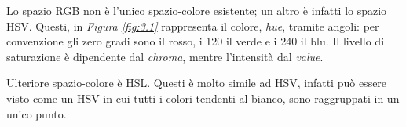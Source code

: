 \documentclass{subfiles}
\begin{document}
Lo spazio RGB non è l'unico spazio-colore esistente; un altro è infatti lo spazio HSV.
Questi, in \emph{Figura \ref{fig:3.1}} rappresenta il colore, \emph{hue}, tramite angoli: per convenzione gli zero gradi sono il rosso, i 120 il verde e i 240 il blu.
Il livello di saturazione è dipendente dal \emph{chroma}, mentre l'intensità dal \emph{value}.

\noindent Ulteriore spazio-colore è HSL. Questi è molto simile ad HSV, infatti può essere visto come un HSV in cui tutti i colori tendenti al bianco,
sono raggruppati in un unico punto.

\end{document}
